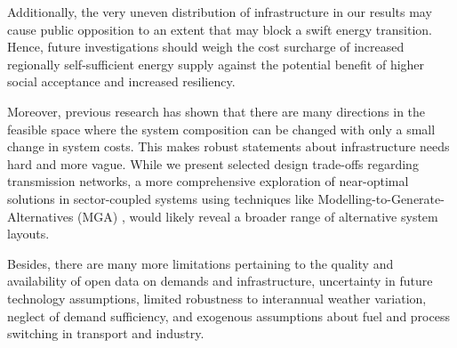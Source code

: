 
Additionally, the very uneven distribution of infrastructure in our results may
cause public opposition to an extent that may block a swift energy transition.
Hence, future investigations should weigh the cost surcharge of increased
regionally self-sufficient energy supply against the potential benefit of higher
social acceptance and increased resiliency.


Moreover, previous research has shown that there are many directions in the
feasible space where the system composition can be changed with only a small
change in system costs. This makes robust statements about infrastructure needs
hard and more vague. While we present selected design trade-offs regarding
transmission networks, a more comprehensive exploration of near-optimal
solutions in sector-coupled systems using techniques like
Modelling-to-Generate-Alternatives (MGA)
\cite{Neumann2019,lombardiPolicyDecision2020,pedersenModelingAll2020}, would
likely reveal a broader range of alternative system layouts.


Besides, there are many more limitations pertaining to the quality and
availability of open data on demands and infrastructure, uncertainty in future
technology assumptions, limited robustness to interannual weather variation,
neglect of demand sufficiency, and exogenous assumptions about fuel and process
switching in transport and industry.